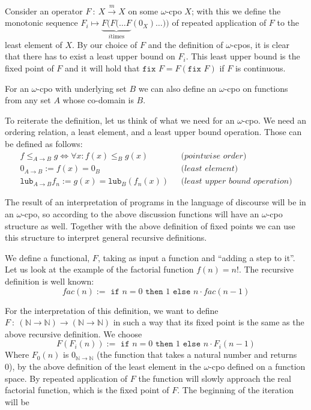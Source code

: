 \documentclass[11pt, leqno, titlepage]{article}
\theoremstyle{definition}
\begin{document}
Consider an operator $F~:~X \xrightarrow{m} X$ on some $\omega$-cpo $X$; with this we
define the monotonic sequence $F_i \mapsto \underbrace{ F(F(\dots F}_{i \text{
    times}} (0_X) \dots))$ of repeated application of $F$ to the least element of $X$.
By our choice of $F$ and the definition of $\omega$-cpos, it is clear that there has
to exist a least upper bound on $F_i$. This least upper bound is the fixed point of
$F$ and it will hold that $\texttt{fix } F = F(\texttt{fix }F)$ if $F$ is
continuous. 

For an $\omega$-cpo with underlying set $B$ we can also define an $\omega$-cpo on
functions from any set $A$ whose co-domain is $B$.

To reiterate the definition, let us think of what we need for an $\omega$-cpo. We
need an ordering relation, a least element, and a least upper bound operation. Those
can be defined as follows:
\begin{align*}
  f\leq_{A \to B} g \Leftrightarrow \forall x: f(x) \leq_B g(x) & ~~~\textit{(pointwise order)}\\
  0_{A\to B} := f(x) = 0_B & ~~~\textit{(least element)}\\
  \texttt{lub}_{A\to B} f_n := g(x) = \texttt{lub}_B(f_n(x)) & ~~~\textit{(least upper
                                                               bound operation)}
\end{align*}


The result of an interpretation of programs in the language of discourse will be in
an $\omega$-cpo, so according to the above discussion functions will have an
$\omega$-cpo structure as well. Together with the above definition of fixed points we
can use this structure to interpret general recursive definitions. 

We define a functional, $F$, taking as input a function and ``adding a step to it''.
Let us look at the example of the factorial function $f(n) = n!$. %
The recursive definition is well known:
$$fac(n) := \texttt{ if } n = 0 \texttt{ then }1\texttt{ else } n\cdot fac(n-1)$$

For the interpretation of this definition, we want to define $F~:~(\mathbb{N} \to
\mathbb{N}) \to (\mathbb{N} \to \mathbb{N})$ in such a way that its fixed point is
the same as the above recursive definition. We choose
$$F(F_i(n)):=\texttt{ if }n=0\texttt{ then }1\texttt{ else }n\cdot F_i(n-1)$$
Where $F_0(n)$ is $0_{\mathbb{N} \to \mathbb{N}}$ (the function that takes a natural
number and returns 0), by the above definition of the least element in the
$\omega$-cpo defined on a function space. By repeated application of $F$ the function
will slowly approach the real factorial function, which is the fixed point of $F$.
The beginning of the iteration will be
\end{document}
